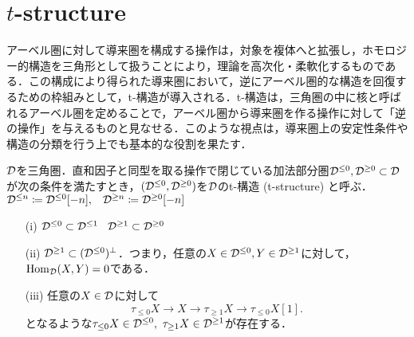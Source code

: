 \section{$t$-structure}

アーベル圏に対して導来圏を構成する操作は，対象を複体へと拡張し，ホモロジー的構造を三角形として扱うことにより，理論を高次化・柔軟化するものである．この構成により得られた導来圏において，逆にアーベル圏的な構造を回復するための枠組みとして，t-構造が導入される．t-構造は，三角圏の中に核と呼ばれるアーベル圏を定めることで，アーベル圏から導来圏を作る操作に対して「逆の操作」を与えるものと見なせる．このような視点は，導来圏上の安定性条件や構造の分類を行う上でも基本的な役割を果たす．
\begin{defn}\cite[p.29]{BBD}
		${\mathcal D}$を三角圏．直和因子と同型を取る操作で閉じている加法部分圏${\mathcal D}^{\le 0},{\mathcal D}^{\ge 0}\subset{\mathcal D}$が次の条件を満たすとき，$({\mathcal D}^{\le 0},{\mathcal D}^{\ge 0})$を${\mathcal D}$のt-構造 (t-structure) と呼ぶ．
		${\mathcal D}^{\le n}\coloneq{\mathcal D}^{\le 0}[-n],\hspace{3mm}{\mathcal D}^{\ge n}\coloneq{\mathcal D}^{\ge 0}[-n] $
		\begin{itemize}
			\item[(i)]
				${\mathcal D}^{\le 0}\subset{\mathcal D}^{\le 1}\hspace{3mm}{\mathcal D}^{\ge 1}\subset{\mathcal D}^{\ge 0} $
			\item[(ii)]
				${\mathcal D}^{\ge 1}\subset ({\mathcal D}^{\le 0})^\perp$．つまり，任意の$X\in {\mathcal D}^{\le 0}, Y\in{\mathcal D}^{\ge 1}$に対して，$\operatorname{\mathrm{Hom}}_{{\mathcal D}}(X,Y)=0$である．
			\item[(iii)]
				任意の$X\in{\mathcal D}$に対して
				\[\tau_{\le 0}X\rightarrow X \rightarrow \tau_{\ge 1}X\rightarrow \tau_{\le 0}X[1].\]
				となるような$\tau_{\le 0}X\in\D^{\le 0},\ \tau_{\ge 1}X\in\D^{\ge 1}$が存在する．
		\end{itemize}
\end{defn}

